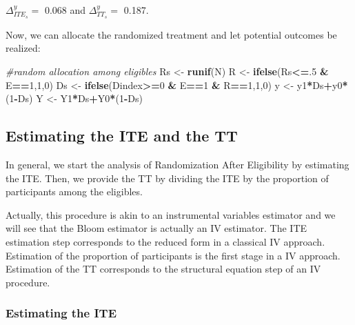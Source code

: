 \documentclass[]{book}
\newenvironment{Shaded}{\begin{snugshade}}{\end{snugshade}}
\newcommand{\KeywordTok}[1]{\textcolor[rgb]{0.13,0.29,0.53}{\textbf{#1}}}
\newcommand{\DecValTok}[1]{\textcolor[rgb]{0.00,0.00,0.81}{#1}}
\newcommand{\StringTok}[1]{\textcolor[rgb]{0.31,0.60,0.02}{#1}}
\newcommand{\CommentTok}[1]{\textcolor[rgb]{0.56,0.35,0.01}{\textit{#1}}}
\newcommand{\OperatorTok}[1]{\textcolor[rgb]{0.81,0.36,0.00}{\textbf{#1}}}
\newcommand{\NormalTok}[1]{#1}
\theoremstyle{definition}
\theoremstyle{definition}
\theoremstyle{definition}
\theoremstyle{remark}
\begin{document}
\(\Delta^y_{ITE_s}=\) 0.068 and \(\Delta^y_{TT_s}=\) 0.187.

Now, we can allocate the randomized treatment and let potential outcomes
be realized:

\begin{Shaded}
\begin{Highlighting}[]
\CommentTok{#random allocation among eligibles}
\NormalTok{Rs <-}\StringTok{ }\KeywordTok{runif}\NormalTok{(N)}
\NormalTok{R <-}\StringTok{ }\KeywordTok{ifelse}\NormalTok{(Rs}\OperatorTok{<=}\NormalTok{.}\DecValTok{5} \OperatorTok{&}\StringTok{ }\NormalTok{E}\OperatorTok{==}\DecValTok{1}\NormalTok{,}\DecValTok{1}\NormalTok{,}\DecValTok{0}\NormalTok{)}
\NormalTok{Ds <-}\StringTok{ }\KeywordTok{ifelse}\NormalTok{(Dindex}\OperatorTok{>=}\DecValTok{0} \OperatorTok{&}\StringTok{ }\NormalTok{E}\OperatorTok{==}\DecValTok{1} \OperatorTok{&}\StringTok{ }\NormalTok{R}\OperatorTok{==}\DecValTok{1}\NormalTok{,}\DecValTok{1}\NormalTok{,}\DecValTok{0}\NormalTok{)}
\NormalTok{y <-}\StringTok{ }\NormalTok{y1}\OperatorTok{*}\NormalTok{Ds}\OperatorTok{+}\NormalTok{y0}\OperatorTok{*}\NormalTok{(}\DecValTok{1}\OperatorTok{-}\NormalTok{Ds)}
\NormalTok{Y <-}\StringTok{ }\NormalTok{Y1}\OperatorTok{*}\NormalTok{Ds}\OperatorTok{+}\NormalTok{Y0}\OperatorTok{*}\NormalTok{(}\DecValTok{1}\OperatorTok{-}\NormalTok{Ds)}
\end{Highlighting}
\end{Shaded}

\subsection{Estimating the ITE and the
TT}\label{estimating-the-ite-and-the-tt}

In general, we start the analysis of Randomization After Eligibility by
estimating the ITE. Then, we provide the TT by dividing the ITE by the
proportion of participants among the eligibles.

Actually, this procedure is akin to an instrumental variables estimator
and we will see that the Bloom estimator is actually an IV estimator.
The ITE estimation step corresponds to the reduced form in a classical
IV approach. Estimation of the proportion of participants is the first
stage in a IV approach. Estimation of the TT corresponds to the
structural equation step of an IV procedure.

\subsubsection{Estimating the ITE}\label{estimating-the-ite}
\end{document}
